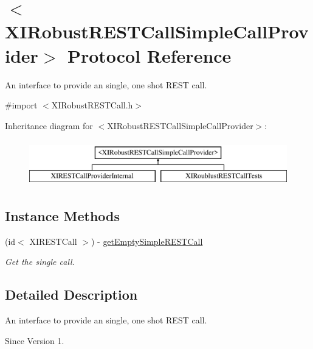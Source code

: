 \hypertarget{protocol_x_i_robust_r_e_s_t_call_simple_call_provider-p}{}\section{$<$X\+I\+Robust\+R\+E\+S\+T\+Call\+Simple\+Call\+Provider$>$ Protocol Reference}
\label{protocol_x_i_robust_r_e_s_t_call_simple_call_provider-p}


An interface to provide an single, one shot R\+E\+ST call.  




{\ttfamily \#import $<$X\+I\+Robust\+R\+E\+S\+T\+Call.\+h$>$}

Inheritance diagram for $<$X\+I\+Robust\+R\+E\+S\+T\+Call\+Simple\+Call\+Provider$>$\+:\begin{figure}[H]
\begin{center}
\leavevmode
\includegraphics[height=2.000000cm]{protocol_x_i_robust_r_e_s_t_call_simple_call_provider-p}
\end{center}
\end{figure}
\subsection*{Instance Methods}
\begin{DoxyCompactItemize}
\item 
(id$<$ X\+I\+R\+E\+S\+T\+Call $>$) -\/ \hyperlink{protocol_x_i_robust_r_e_s_t_call_simple_call_provider-p_afcb9112b7b1b748b0f2c6fe7b279f96b}{get\+Empty\+Simple\+R\+E\+S\+T\+Call}
\begin{DoxyCompactList}\small\item\em Get the single call. \end{DoxyCompactList}\end{DoxyCompactItemize}


\subsection{Detailed Description}
An interface to provide an single, one shot R\+E\+ST call. 

\begin{DoxySince}{Since}
Version 1. 
\end{DoxySince}



